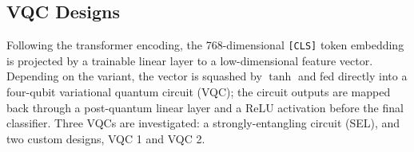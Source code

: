 \documentclass[runningheads]{llncs}
\begin{document}



\subsection{VQC Designs}\label{sec:vqc}
Following the transformer encoding, the 768-dimensional \texttt{[CLS]} token embedding is projected by a trainable linear layer to a low-dimensional feature vector. Depending on the variant, the vector is squashed by $\tanh$ and fed directly into a four-qubit variational quantum circuit (VQC); the circuit outputs are mapped back through a post-quantum linear layer and a ReLU activation before the final classifier. Three VQCs are investigated: a strongly-entangling circuit (SEL), and two custom designs, VQC 1 and VQC 2.
\end{document}
